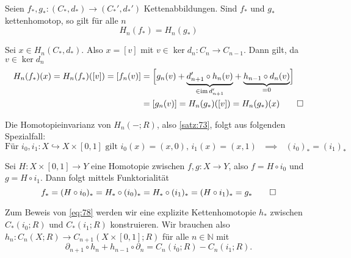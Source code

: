 \begin{proposition}[{name=[{Induzierte Abbildungen von kettenhomotopen Kettenabbildungen sind gleich}]}]
	Seien $f_*,g_* \colon (C_*,d_*) \to (C_*',d_*')$ Kettenabbildungen. Sind $f_*$ und $g_*$ kettenhomotop, so gilt für alle $n$
	\[
		H_n(f_*) = H_n(g_*)
	\]
\end{proposition}
\begin{beweis}
	Sei $x \in H_n(C_*,d_*)$. Also $x=[v]$ mit $v \in \ker d_n \colon C_n \to C_{n-1}$. Dann gilt, da $v \in \ker d_n$
	\begin{align*}
		H_n(f_*)(x) = H_n(f_*) \enbrace*{[v]} = \benbrace*{f_n(v)}  &= \benbrace[\Big]{g_n(v) + {\underbrace{ d_{n+1}' \circ h_n(v)}_{\in \im d_{n+1}'}} + {\underbrace{h_{n-1} \circ d_n(v)}_{=0}}} \\[-1pt]
		&= \benbrace*{g_n(v)} = H_n(g_*) \enbrace*{[v]} = H_n(g_*)(x) \qedhere
	\end{align*}
\end{beweis}

\begin{lemma}[{name=[{Reduktion von \autoref{satz:73} auf Beweis eines Spezialfalles}]},label=lem:78]
	Die Homotopieinvarianz von $H_n(-;R)$, also \autoref{satz:73}, folgt aus folgenden Spezialfall:
	\begin{equation*}
		\text{Für $i_0,i_1 \colon X \hookrightarrow X \times [0,1]$ gilt $i_0(x)= (x,0)$, $i_1(x)=(x,1)$ $\implies$ $(i_0)_* = (i_1)_*$} \label{eq:78} \tag{\#}
	\end{equation*}
\end{lemma}
\begin{beweis}
	Sei $H \colon X \times [0,1] \to Y$ eine Homotopie zwischen $f,g \colon X \to Y$, also $f = H \circ i_0$ und $g = H \circ i_1$. Dann folgt mittels Funktorialität 
	\[
		f_* = (H \circ i_0)_* = H_* \circ (i_0)_* = H_* \circ (i_1)_* = (H \circ i_1)_* = g_* \qedhere
	\]
\end{beweis}

\begin{bemerkung}
	Zum Beweis von \eqref{eq:78} werden wir eine explizite Kettenhomotopie $h_*$ zwischen $C_*(i_0;R)$ und $C_*(i_1;R)$ konstruieren. 
	Wir brauchen also $h_n \colon C_n(X;R) \to C_{n+1}(X \times [0,1];R)$ für alle $n \in \mathbb{N}$ mit 
	\begin{equation*}
		\partial_{n+1} \circ h_n + h_{n-1} \circ \partial_n = C_n(i_0;R)- C_n(i_1;R). \label{eq:79} \tag{\#\#}
	\end{equation*}
\end{bemerkung}

